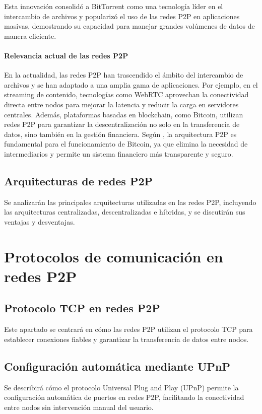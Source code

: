 Esta innovación consolidó a BitTorrent como una tecnología líder en el intercambio de archivos y popularizó el uso de las redes P2P en aplicaciones masivas,
demostrando su capacidad para manejar grandes volúmenes de datos de manera eficiente.

\paragraph{Relevancia actual de las redes P2P}

En la actualidad, las redes P2P han trascendido el ámbito del intercambio de archivos y se han adaptado a una amplia gama de aplicaciones.
Por ejemplo, en el streaming de contenido, tecnologías como WebRTC aprovechan la conectividad directa entre nodos para mejorar la latencia y reducir la carga en servidores centrales.
Además, plataformas basadas en blockchain, como Bitcoin, utilizan redes P2P para garantizar la descentralización no solo en la transferencia de datos, sino también en la gestión financiera.
Según \cite{nakamoto2008}, la arquitectura P2P es fundamental para el funcionamiento de Bitcoin, ya que elimina la necesidad de intermediarios y permite un sistema financiero más transparente y seguro.

\subsection{Arquitecturas de redes P2P}
Se analizarán las principales arquitecturas utilizadas en las redes P2P, incluyendo las arquitecturas centralizadas, descentralizadas e híbridas, y se discutirán sus ventajas y desventajas.

\section{Protocolos de comunicación en redes P2P}
\subsection{Protocolo TCP en redes P2P}
Este apartado se centrará en cómo las redes P2P utilizan el protocolo TCP para establecer conexiones fiables y garantizar la transferencia de datos entre nodos.

\subsection{Configuración automática mediante UPnP}
Se describirá cómo el protocolo Universal Plug and Play (UPnP) permite la configuración automática de puertos en redes P2P, facilitando la conectividad entre nodos sin intervención manual del usuario.


